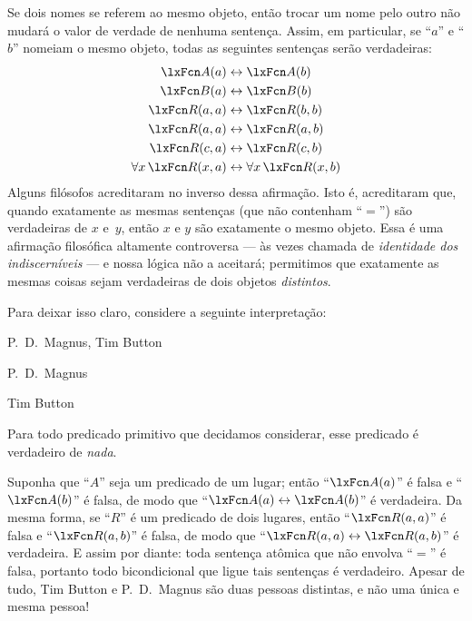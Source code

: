 Se dois nomes se referem ao mesmo objeto, então trocar um nome pelo outro não mudará o valor de verdade de nenhuma sentença. Assim, em particular, se \textquotedblleft $a$\textquotedblright{} e \textquotedblleft $b$\textquotedblright{} nomeiam o mesmo objeto, todas as seguintes sentenças serão verdadeiras:\label{model.nonidentity}
	\begin{align*}
	 	\atom{A}{a} &\eiff \atom{A}{b} \\
	 	\atom{B}{a} &\eiff \atom{B}{b}\\
		\atom{R}{a,a} &\eiff \atom{R}{b,b}\\
		\atom{R}{a,a} & \eiff \atom{R}{a,b}\\
		\atom{R}{c,a} &\eiff \atom{R}{c,b}\\
		\forall x\, \atom{R}{x,a} &\eiff \forall x\, \atom{R}{x,b}
	\end{align*}
Alguns filósofos acreditaram no inverso dessa afirmação. Isto é, acreditaram que, quando exatamente as mesmas sentenças (que não contenham \textquotedblleft $=$\textquotedblright{}) são verdadeiras de $x$ e~$y$, então $x$ e $y$ são exatamente o mesmo objeto. Essa é uma afirmação filosófica altamente controversa — às vezes chamada de \emph{identidade dos indiscerníveis} — e nossa lógica não a aceitará; permitimos que exatamente as mesmas coisas sejam verdadeiras de dois objetos \emph{distintos}.

Para deixar isso claro, considere a seguinte interpretação:
	\begin{ekey}
\item[\text{domínio}] P.~D.\ Magnus, Tim Button
		\item[a] P.~D.\ Magnus
		\item[b] Tim Button
\item[\atom{\metav{R}}{x_1,\dots, x_n}] Para todo predicado primitivo  que decidamos considerar, esse predicado é verdadeiro de \emph{nada}.


	\end{ekey}
Suponha que \textquotedblleft $A$\textquotedblright{} seja um predicado de um lugar; então \textquotedblleft $\atom{A}{a}$\textquotedblright{} é falsa e \textquotedblleft $\atom{A}{b}$\textquotedblright{} é falsa, de modo que \textquotedblleft $\atom{A}{a} \eiff \atom{A}{b}$\textquotedblright{} é verdadeira. Da mesma forma, se \textquotedblleft $R$\textquotedblright{} é um predicado de dois lugares, então \textquotedblleft $\atom{R}{a,a}$\textquotedblright{} é falsa e \textquotedblleft $\atom{R}{a,b}$\textquotedblright{} é falsa, de modo que \textquotedblleft $\atom{R}{a,a} \eiff \atom{R}{a,b}$\textquotedblright{} é verdadeira. E assim por diante: toda sentença atômica que não envolva \textquotedblleft $=$\textquotedblright{} é falsa, portanto todo bicondicional que ligue tais sentenças é verdadeiro. Apesar de tudo, Tim Button e P.~D.\ Magnus são duas pessoas distintas, e não uma única e mesma pessoa!


